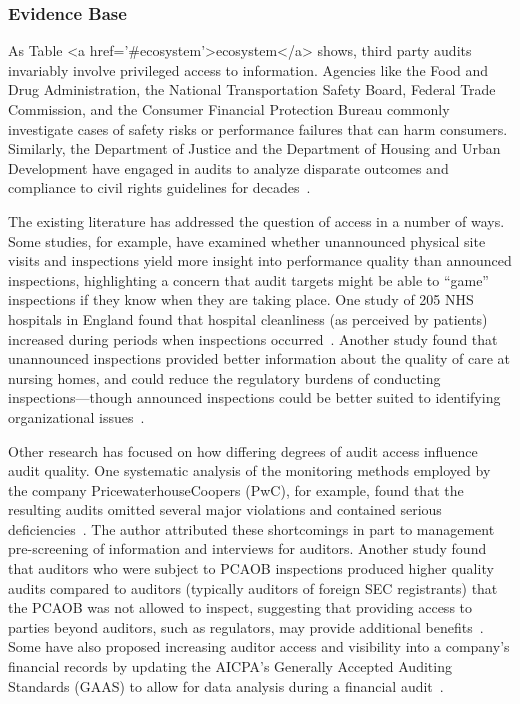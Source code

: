 \documentclass[sigconf]{acmart}
\begin{document}
\subsubsection{Evidence Base}

As Table <a href='#ecosystem'>ecosystem</a> shows, third party audits invariably involve privileged access to information. Agencies like the Food and Drug Administration, the National Transportation Safety Board, Federal Trade Commission, and the Consumer Financial Protection Bureau commonly investigate cases of safety risks or performance failures that can harm consumers. Similarly, the Department of Justice and the Department of Housing and Urban Development have engaged in audits to analyze disparate outcomes and compliance to civil rights guidelines for decades~\cite{vecchione2021algorithmic}.

The existing literature has addressed the question of access in a number of ways. Some studies, for example, have examined whether unannounced physical site visits and inspections yield more insight into performance quality than announced inspections, highlighting a concern that audit targets might be able to “game” inspections if they know when they are taking place. One study of 205 NHS hospitals in England found that hospital cleanliness (as perceived by patients) increased during periods when inspections occurred~\cite{toffolutti2017evidence}. Another study found that unannounced inspections provided better information about the quality of care at nursing homes, and could reduce the regulatory burdens of conducting inspections—though announced inspections could be better suited to identifying organizational issues~\cite{klerks2013unannounced}. 

Other research has focused on how differing degrees of audit access influence audit quality. One systematic analysis of the monitoring methods employed by the company PricewaterhouseCoopers (PwC), for example, found that the resulting audits omitted several major violations and contained serious deficiencies~\cite{o2000monitoring}. The author attributed these shortcomings in part to management pre-screening of information and interviews for auditors. Another study found that auditors who were subject to PCAOB inspections produced higher quality audits compared to auditors (typically auditors of foreign SEC registrants) that the PCAOB was not allowed to inspect, suggesting that providing access to parties beyond auditors, such as regulators, may provide additional benefits~\cite{lamoreaux2016does}. Some have also proposed increasing auditor access and visibility into a company’s financial records by updating the AICPA’s Generally Accepted Auditing Standards (GAAS) to allow for data analysis during a financial audit~\cite{titera2013updating}.
\end{document}
